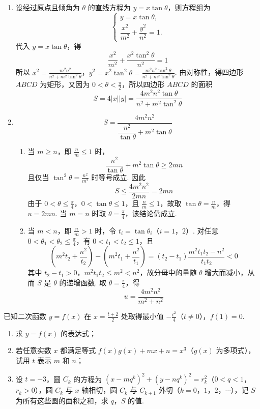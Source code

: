 \documentclass[UTF8,a4paper,oneside,11pt]{ctexbook}
\begin{document}
\begin{solution}
\begin{enumerate}
\item 设经过原点且倾角为 \(\theta\) 的直线方程为 \(y=x\tan\theta\)，则方程组为
\[
\begin{cases}
y=x\tan\theta,\\
\dfrac{x^2}{m^2}+\dfrac{y^2}{n^2}=1.
\end{cases}
\]
代入 \(y=x\tan\theta\)，得
\[
\frac{x^2}{m^2}+\frac{x^2\tan^2\theta}{n^2}=1
\]
所以
\(x^2=\frac{m^2n^2}{n^2+m^2\tan^2\theta}\)，\(y^2=x^2\tan^2\theta =\frac{m^2n^2\tan^2\theta}{n^2+m^2\tan^2\theta}\).
由对称性，得四边形 \(ABCD\) 为矩形，又因为 \(0<\theta<\frac{\pi}{2}\)，所以四边形 \(ABCD\) 的面积
\[
S=4|x||y|=\frac{4m^2n^2\tan\theta}{n^2+m^2\tan^2\theta}
\]

\item
\[
S=\frac{4m^2n^2}{\dfrac{n^2}{\tan\theta}+m^2\tan\theta}
\]

\begin{enumerate}
\item 当 \(m\geqslant n\)，即 \(\frac{n}{m}\leqslant1\) 时，
\[
\frac{n^2}{\tan\theta}+m^2\tan\theta\geqslant2mn
\]
且仅当 \(\tan^2\theta=\frac{n^2}{m^2}\) 时等号成立. 因此
\[
S\leqslant\frac{4m^2n^2}{2mn}=2mn
\]
由于 \(0<\theta\leqslant\frac{\pi}{4}\)，\(0<\tan\theta\leqslant1\)，且 \(\frac{n}{m}\leqslant1\)，故取 \(\tan\theta=\frac{n}{m}\)，得 \(u=2mn\). 当 \(m=n\) 时取 \(\theta=\frac{\pi}{4}\)，该结论仍成立.

        \item 当 \(m<n\)，即 \(\frac{n}{m}>1\) 时，令 \(t_i=\tan\theta_i\)（\(i=1\)，\(2\)）. 对任意 \(0<\theta_1<\theta_2\leqslant\frac{\pi}{4}\)，有 \(0<t_1<t_2\leqslant1\)，且
\[
\left(m^2t_2+\frac{n^2}{t_2}\right)-\left(m^2t_1+\frac{n^2}{t_1}\right)=(t_2-t_1)\frac{m^2t_1t_2-n^2}{t_1t_2}<0
\]
其中 \(t_2-t_1>0\)，\(m^2t_1t_2\leqslant m^2<n^2\)，故分母中的量随 \(\theta\) 增大而减小，从而 \(S\) 是 \(\theta\) 的递增函数. 取 \(\theta=\frac{\pi}{4}\)，得
\[
u=\frac{4m^2n^2}{m^2+n^2}
\]
\end{enumerate}
\end{enumerate}
\end{solution}

\begin{problem}
已知二次函数 \(y=f(x)\) 在 \(x=\frac{t+2}{2}\) 处取得最小值 \(-\frac{t^2}{4}\)（\(t\neq 0\)），\(f(1)=0\).

\begin{enumerate}
\item 求 \(y=f(x)\) 的表达式；
\item 若任意实数 \(x\) 都满足等式 \(f(x)g(x)+mx+n=x^3\)（\(g(x)\) 为多项式），试用 \(t\) 表示 \(m\) 和 \(n\)；
\item 设 \(t=-3\)，圆 \(C_k\) 的方程为 \((x-mq^k)^2+(y-nq^k)^2=r_k^2\)（\(0<q<1\)，\(r_k>0\)），圆 \(C_k\) 与 \(x\) 轴相切，圆 \(C_k\) 与 \(C_{k+1}\) 外切（\(k=0\)，\(1\)，\(2\)，\(\cdots\)），记 \(S\) 为所有这些圆的面积之和，求 \(q\)，\(S\) 的值.
\end{enumerate}
\end{problem}
\end{document}
